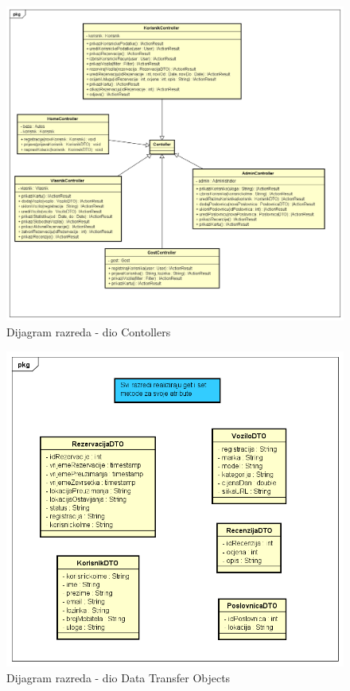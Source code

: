 	        
	        \begin{figure}[hp]
                \centering
                \includegraphics[width=16cm]{slike/dijagramRazreda1.png}
                \caption{Dijagram razreda - dio Contollers}
                \label{fig:classDiagram-1}
            \end{figure}
            \newpage
            
            \begin{figure}[hp]
                \centering
                \includegraphics[width=16cm]{slike/dijagramRazreda2.png}
                \caption{Dijagram razreda - dio Data Transfer Objects}
                \label{fig:classDiagram-2}
            \end{figure}
            
